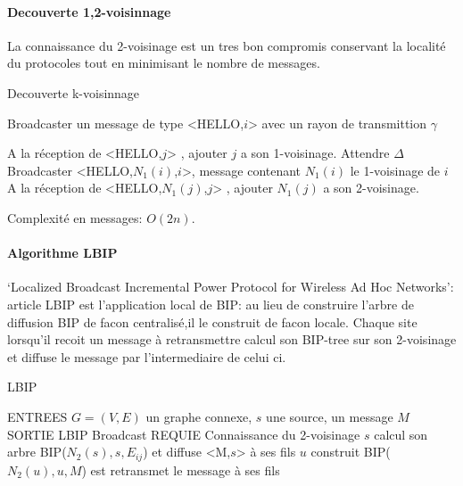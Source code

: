 \paragraph{Decouverte 1,2-voisinnage}

La connaissance du 2-voisinage est un tres bon compromis conservant la localité du protocoles tout en minimisant le nombre de messages.


\begin{algorithm}[h]
\caption{Decouverte k-voisinnage}
\label{algo_k_voisinnage}
\begin{algorithmic}

	\STATE Broadcaster un message de type <HELLO,$i$> avec un rayon de transmittion $\gamma$
\ENDFOR

\STATE A la réception de <HELLO,$j$> , ajouter $j$ a son 1-voisinage.
\STATE Attendre $\Delta$
	\STATE Broadcaster <HELLO,$N_1(i)$,$i$>, message contenant $N_1(i)$ le 1-voisinage de $i$
	\STATE A la réception de <HELLO,$N_1(j)$,$j$> , ajouter $N_1(j)$ a son 2-voisinage.
	
\ENDFOR
\end{algorithmic}
\end{algorithm}

Complexité en messages: $O(2n)$.


\paragraph{Algorithme LBIP}  `Localized Broadcast Incremental Power Protocol for Wireless Ad Hoc Networks': article \cite{Ingelrest2004}
LBIP est l'application local de BIP: au lieu de construire l'arbre de diffusion BIP de facon centralisé,il le construit de facon locale.
Chaque site lorsqu'il recoit un message à retransmettre calcul son BIP-tree sur son 2-voisinage et diffuse le message par l'intermediaire de celui ci.

\begin{algorithm}[h]
\caption{LBIP}
\label{algo_LBIP}
\begin{algorithmic}
\STATE ENTREES  $G=(V,E)$ un graphe connexe, $s$ une source, un message $M$
\STATE SORTIE  LBIP Broadcast
\STATE REQUIE  Connaissance du 2-voisinage
\STATE $s$ calcul son arbre BIP($N_2(s),s,E_{ij}$) et diffuse <M,$s$> à ses fils
		\STATE $u$ construit BIP($N_2(u),u,M$) est retransmet le message à ses fils
	\ENDIF
\ENDIF
\end{algorithmic}
\end{algorithm}


